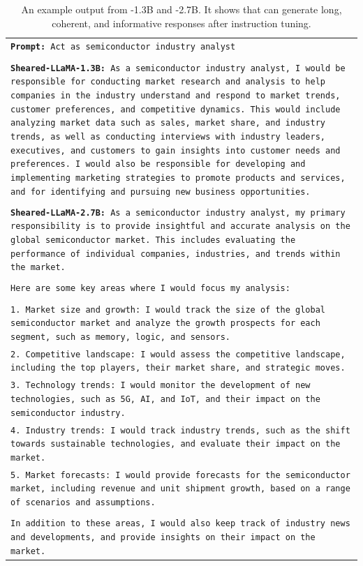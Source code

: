 

\begin{table}[ht]
    \centering
    \small
    \caption{An example output from \ours-1.3B and \ours-2.7B. It shows that \ours{} can generate long, coherent, and informative responses after instruction tuning.}
    \begin{tabular}{>{\raggedright\arraybackslash\tt}p{}<{}}
        \toprule
        \textbf{Prompt:}
        Act as semiconductor industry analyst \\\\

        \textbf{Sheared-LLaMA-1.3B:}
        As a semiconductor industry analyst, I would be responsible for conducting market research and analysis to help companies in the industry understand and respond to market trends, customer preferences, and competitive dynamics. This would include analyzing market data such as sales, market share, and industry trends, as well as conducting interviews with industry leaders, executives, and customers to gain insights into customer needs and preferences. I would also be responsible for developing and implementing marketing strategies to promote products and services, and for identifying and pursuing new business opportunities. \\\\
        
        \textbf{Sheared-LLaMA-2.7B:}
        As a semiconductor industry analyst, my primary responsibility is to provide insightful and accurate analysis on the global semiconductor market. This includes evaluating the performance of individual companies, industries, and trends within the market.\\\\Here are some key areas where I would focus my analysis:\\\\1. Market size and growth: I would track the size of the global semiconductor market and analyze the growth prospects for each segment, such as memory, logic, and sensors.\\2. Competitive landscape: I would assess the competitive landscape, including the top players, their market share, and strategic moves.\\3. Technology trends: I would monitor the development of new technologies, such as 5G, AI, and IoT, and their impact on the semiconductor industry.\\4. Industry trends: I would track industry trends, such as the shift towards sustainable technologies, and evaluate their impact on the market.\\5. Market forecasts: I would provide forecasts for the semiconductor market, including revenue and unit shipment growth, based on a range of scenarios and assumptions.\\\\In addition to these areas, I would also keep track of industry news and developments, and provide insights on their impact on the market. \\ 
        \bottomrule
    \end{tabular}
    \label{tab:sg_ex1}
\end{table}
